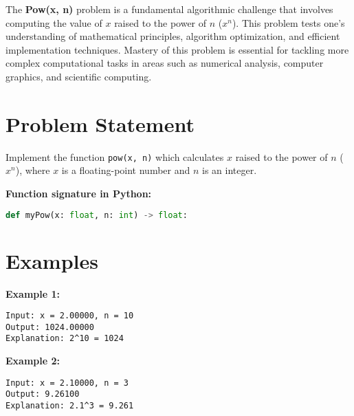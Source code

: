 
\label{chap:Pow_x_n}

The \textbf{Pow(x, n)} problem is a fundamental algorithmic challenge that involves computing the value of \(x\) raised to the power of \(n\) (\(x^n\)). This problem tests one's understanding of mathematical principles, algorithm optimization, and efficient implementation techniques. Mastery of this problem is essential for tackling more complex computational tasks in areas such as numerical analysis, computer graphics, and scientific computing.

\section*{Problem Statement}

Implement the function \texttt{pow(x, n)} which calculates \(x\) raised to the power of \(n\) (\(x^n\)), where \(x\) is a floating-point number and \(n\) is an integer.

\textbf{Function signature in Python:}
\begin{lstlisting}[language=Python]
def myPow(x: float, n: int) -> float:
\end{lstlisting}

\section*{Examples}

\textbf{Example 1:}

\begin{verbatim}
Input: x = 2.00000, n = 10
Output: 1024.00000
Explanation: 2^10 = 1024
\end{verbatim}

\textbf{Example 2:}

\begin{verbatim}
Input: x = 2.10000, n = 3
Output: 9.26100
Explanation: 2.1^3 = 9.261
\end{verbatim}

